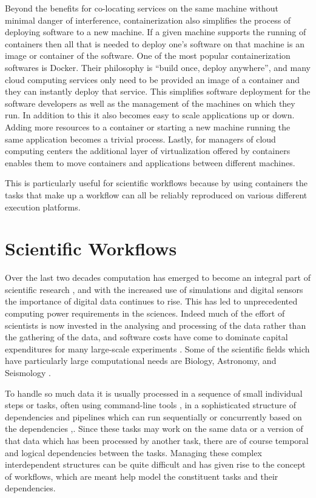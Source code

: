 Beyond the benefits for co-locating services on the same machine without minimal danger of interference, containerization also simplifies the process of deploying software to a new machine. If a given machine supports the running of containers then all that is needed to deploy one's software on that machine is an image or container of the software. One of the most popular containerization softwares is Docker. Their philosophy is ``build once, deploy anywhere'', and many cloud computing services only need to be provided an image of a container and they can instantly deploy that service. This simplifies software deployment for the software developers as well as the management of the machines on which they run. In addition to this it also becomes easy to scale applications up or down. Adding more resources to a container or starting a new machine running the same application becomes a trivial process. Lastly, for managers of cloud computing centers the additional layer of virtualization offered by containers enables them to move containers and applications between different machines. 

This is particularly useful for scientific workflows because by using containers the tasks that make up a workflow can all be reliably reproduced on various different execution platforms. 

\section{Scientific Workflows}
\label{sec:workflows}

Over the last two decades computation has emerged to become an integral part of scientific research \cite{deelman},\cite{parallelization} and with the increased use of simulations and digital sensors the importance of digital data continues to rise\cite{ScientificWorkflows}. This has led to unprecedented computing power requirements in the sciences. Indeed much of the effort of scientists is now invested in the analysing and processing of the data rather than the gathering of the data, and software costs have come to dominate capital expenditures for many large-scale experiments \cite{Gray}. Some of the scientific fields which have particularly large computational needs are Biology, Astronomy, and Seismology \cite{ScientificWorkflows}. 

To handle so much data it is usually processed in a sequence of small individual steps or tasks, often using command-line tools \cite{FeedbackBasedAllocation}, in a sophisticated structure of dependencies and pipelines which can run sequentially or concurrently based on the dependencies \cite{parallelization},\cite{examining}. Since these tasks may work on the same data or a version of that data which has been processed by another task, there are of course temporal and logical dependencies between the tasks. Managing these complex interdependent structures can be quite difficult and has given rise to the concept of workflows, which are meant help model the constituent tasks and their dependencies. 

